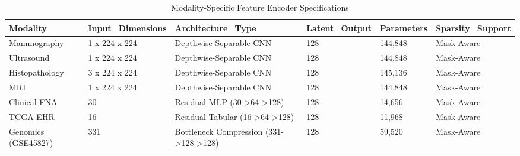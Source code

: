 \begin{table}
\caption{Modality-Specific Feature Encoder Specifications}
\begin{tabular}{llllll}
\toprule
Modality & Input_Dimensions & Architecture_Type & Latent_Output & Parameters & Sparsity_Support \\
\midrule
Mammography & 1 x 224 x 224 & Depthwise-Separable CNN & 128 & 144,848 & Mask-Aware \\
Ultrasound & 1 x 224 x 224 & Depthwise-Separable CNN & 128 & 144,848 & Mask-Aware \\
Histopathology & 3 x 224 x 224 & Depthwise-Separable CNN & 128 & 145,136 & Mask-Aware \\
MRI & 1 x 224 x 224 & Depthwise-Separable CNN & 128 & 144,848 & Mask-Aware \\
Clinical FNA & 30 & Residual MLP (30->64->128) & 128 & 14,656 & Mask-Aware \\
TCGA EHR & 16 & Residual Tabular (16->64->128) & 128 & 11,968 & Mask-Aware \\
Genomics (GSE45827) & 331 & Bottleneck Compression (331->128->128) & 128 & 59,520 & Mask-Aware \\
\bottomrule
\end{tabular}
\end{table}
